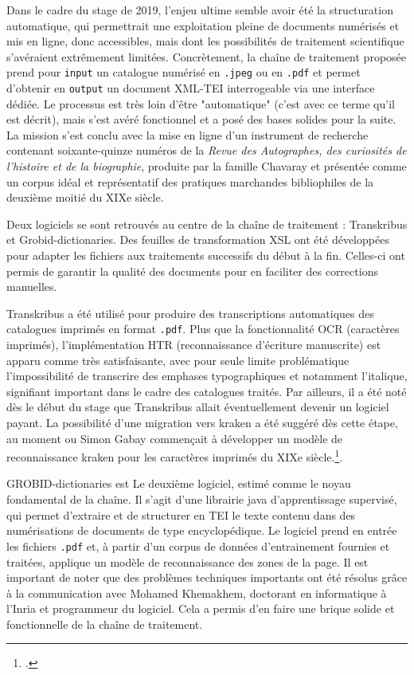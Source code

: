 \documentclass[a4paper,12pt,twoside]{book}
\begin{document}
Dans le cadre du stage de 2019, l'enjeu ultime semble avoir été la structuration automatique, qui permettrait une exploitation pleine de documents numérisés et mis en ligne, donc accessibles, mais dont les possibilités de traitement scientifique s'avéraient extrêmement limitées. Concrètement, la chaîne de traitement proposée prend pour \texttt{input} un catalogue numérisé en \texttt{.jpeg} ou en \texttt{.pdf} et permet d'obtenir en \texttt{output} un document XML-TEI interrogeable via une interface dédiée. Le processus est très loin d'être "automatique" (c'est avec ce terme qu'il est décrit), mais s'est avéré fonctionnel et a posé des bases solides pour la suite. La mission s'est conclu avec la mise en ligne d'un instrument de recherche contenant soixante-quinze numéros de la \textit{Revue des Autographes, des curiosités de l’histoire et de la biographie}, produite par la famille Chavaray et présentée comme un corpus idéal et représentatif des pratiques marchandes bibliophiles de la deuxième moitié du XIXe siècle. 
  
Deux logiciels se sont retrouvés au centre de la chaîne de traitement : Transkribus et Grobid-dictionaries. Des feuilles de transformation XSL ont été développées pour adapter les fichiers aux traitements successifs du début à la fin. Celles-ci ont permis de garantir la qualité des documents pour en faciliter des corrections manuelles. 

Transkribus a été utilisé pour produire des transcriptions automatiques des catalogues imprimés en format \texttt{.pdf}. Plus que la fonctionnalité OCR (caractères imprimés), l'implémentation HTR (reconnaissance d'écriture manuscrite) est apparu comme très satisfaisante, avec pour seule limite problématique l'impossibilité de transcrire des emphases typographiques et notamment l'italique, signifiant important dans le cadre des catalogues traités. Par ailleurs, il a été noté dès le début du stage que Transkribus allait éventuellement devenir un logiciel payant. La possibilité d'une migration vers kraken a été suggéré dès cette étape, au moment ou Simon Gabay commençait à développer un modèle de reconnaissance kraken pour les caractères imprimés du XIXe siècle.\footcite{gabay_19th_nodate}. 

GROBID-dictionaries est Le deuxième logiciel, estimé comme le noyau fondamental de la chaîne. Il s'agit d'une librairie java d’apprentissage supervisé, qui permet d'extraire et de structurer en TEI le texte contenu dans des numérisations de documents de type encyclopédique. Le logiciel prend en entrée les fichiers \texttt{.pdf} et, à partir d'un corpus de données d'entrainement fournies et traitées, applique un modèle de reconnaissance des zones de la page. Il est important de noter que des problèmes techniques importants ont été résolus grâce à la communication avec Mohamed Khemakhem, doctorant en informatique à l'Inria et programmeur du logiciel. Cela a permis d'en faire une brique solide et fonctionnelle de la chaîne de traitement.
\end{document}
